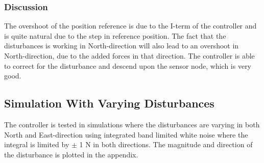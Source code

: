 \subsubsection{Discussion}
The overshoot of the position reference is due to the I-term of the controller and is quite natural due to the step in reference position. The fact that the disturbances is working in North-direction will also lead to an overshoot in North-direction, due to the added forces in that direction. The controller is able to correct for the disturbance and descend upon the sensor node, which is very good. 
\subsection{Simulation With Varying Disturbances}
The controller is tested in simulations where the disturbances are varying in both North and East-direction using integrated band limited white noise where the integral is limited by $\pm$ 1 N in both directions. The magnitude and direction of the disturbance is plotted in the appendix.
